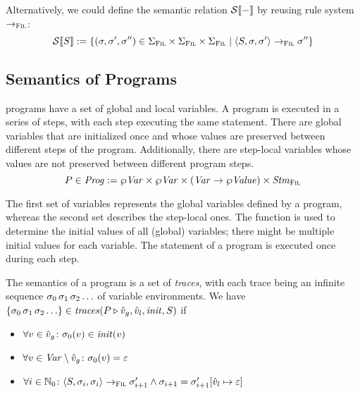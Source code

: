 \documentclass[a4paper,10pt,english]{article}
\begin{document}
Alternatively, we could define the semantic relation $\mathcal{S} \llbracket - \rrbracket$ by reusing rule system $\rightarrow_{\textsc{Fil}}$:
\begin{equation*}
	\mathcal{S} \llbracket S \rrbracket := \{ (\sigma, \sigma', \sigma'') \in \Sigma_\textsc{Fil} \times \Sigma_\textsc{Fil} \times \Sigma_\textsc{Fil} \mid
	\langle S, \sigma, \sigma' \rangle \rightarrow_{\textsc{Fil}} \sigma'' \}
\end{equation*}

\subsection{Semantics of \Fil Programs}

\Fil programs have a set of global and local variables. A \Fil program is executed in a series of steps, with each step executing
the same statement. There are global variables that are initialized once and whose values are preserved between
different steps of the program. Additionally, there are step-local variables whose values are not preserved between different
program steps.
\begin{equation*}
	P \in \mathit{Prog} := \wp \mathit{Var} \times \wp \mathit{Var} \times (\mathit{Var} \rightarrow \wp \mathit{Value}) \times \mathit{Stm}_\textsc{Fil}
\end{equation*}

The first set of variables represents the global variables defined by a program, whereas the second set describes the step-local
ones. The function is used to determine the initial values of all (global) variables; there might be multiple initial
values for each variable. The statement of a program is executed once during each step.

\begin{samepage}
	The semantics of a \Fil program is a set of \textit{traces}, with each trace being an infinite sequence $\sigma_0 \,
	\sigma_1 \, \sigma_2 \ldots$ of variable environments. We have $\{ \sigma_0 \, \sigma_1 \, \sigma_2 \ldots \}
	\in \mathit{traces}(P \triangleright \hat{v}_g, \hat{v}_l, \mathit{init}, S)$ if
	\begin{itemize}
		\item $\forall v \in \hat{v}_g \colon \sigma_0(v) \in \mathit{init}(v)$
		\item $\forall v \in \mathit{Var} \setminus \hat{v}_g \colon \sigma_0(v) = \varepsilon$
		\item $\forall i \in \mathbb{N}_0 \colon \langle S, \sigma_i, \sigma_i \rangle \rightarrow_{\textsc{Fil}}
		\sigma_{i+1}' \wedge \sigma_{i+1} = \sigma_{i + 1}'[\hat{v}_l \mapsto \varepsilon]$
	\end{itemize}
\end{samepage}
\end{document}
